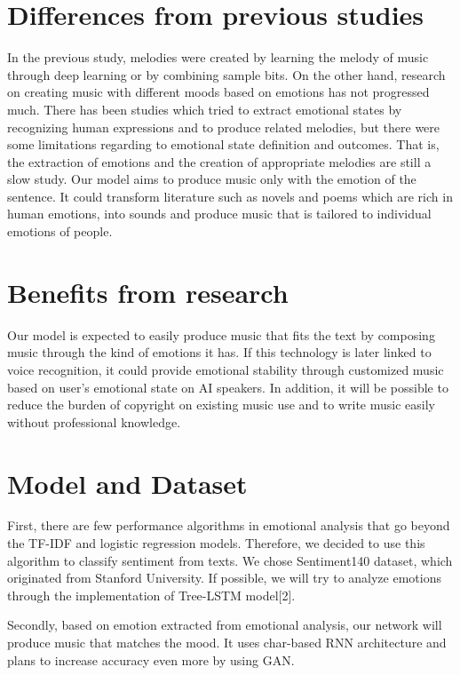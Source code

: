 \documentclass{article}
\begin{document}
\section{Differences from previous studies}

In the previous study, melodies were created by learning the melody of music through deep learning or by combining sample bits. On the other hand, research on creating music with different moods based on emotions has not progressed much. There has been studies which tried to extract emotional states by recognizing human expressions and to produce related melodies, but there were some limitations regarding to emotional state definition and outcomes. That is, the extraction of emotions and the creation of appropriate melodies are still a slow study. Our model aims to produce music only with the emotion of the sentence. It could transform literature such as novels and poems which are rich in human emotions, into sounds and produce music that is tailored to individual emotions of people.

\section{Benefits from research}

Our model is expected to easily produce music that fits the text by composing music through the kind of emotions it has. If this technology is later linked to voice recognition, it could provide emotional stability through customized music based on user's emotional state on AI speakers. In addition, it will be possible to reduce the burden of copyright on existing music use and to write music easily without professional knowledge.

\section{Model and Dataset}

First, there are few performance algorithms in emotional analysis that go beyond the TF-IDF and logistic regression models. Therefore, we decided to use this algorithm to classify sentiment from texts. We chose Sentiment140 dataset, which originated from Stanford University. If possible, we will try to analyze emotions through the implementation of Tree-LSTM model[2].

Secondly, based on emotion extracted from emotional analysis, our network will produce music that matches the mood. It uses char-based RNN architecture and plans to increase accuracy even more by using GAN. 
\end{document}
